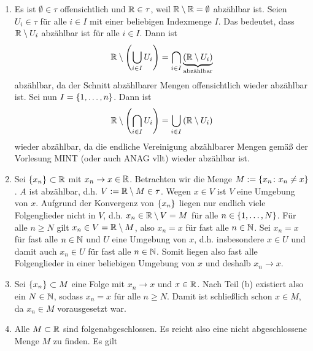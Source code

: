 \begin{exercisePage}
	\begin{enumerate}[leftmargin=\zulength, label=(zu \alph*)]
		\item Es ist $\emptyset \in \tau$ offensichtlich und $\mathbb{R} \in \tau$, weil $\mathbb{R} \setminus \mathbb{R} = \emptyset$ abzählbar ist. Seien $U_i \in \tau$ für alle $i \in I$ mit einer beliebigen Indexmenge $I$. Das bedeutet, dass $\mathbb{R} \setminus U_i$ abzählbar ist für alle $i \in I$. Dann ist
		\begin{equation*}
		\mathbb{R} \setminus \left( \bigcup_{i \in I} U_i \right) = \bigcap_{i \in I} \underbrace{\left( \mathbb{R} \setminus U_i \right)}_{\text{abzählbar}}
		\end{equation*}
		abzählbar, da der Schnitt abzählbarer Mengen offensichtlich wieder abzählbar ist. Sei nun $I = \left\{ 1,\dots,n \right\}$. Dann ist
		\begin{equation*}
		\mathbb{R} \setminus \left( \bigcap_{i \in I} U_i \right) = \bigcup_{i \in I} \left( \mathbb{R} \setminus U_i \right)
		\end{equation*}
		wieder abzählbar, da die endliche Vereinigung abzählbarer Mengen gemäß der Vorlesung MINT (oder auch ANAG vllt) wieder abzählbar ist.
		\item \begin{proof-equivalence}
			\hinrichtung Sei $\left\{ x_n \right\}_{} \subset \mathbb{R}$ mit $x_n \to x \in \mathbb{R}$. Betrachten wir die Menge $M \mathrel{:=} \left\{ x_n \colon x_n \neq x \right\}$. $A$ ist abzählbar, d.h. $V \mathrel{:=} \mathbb{R} \setminus M \in \tau$. Wegen $x \in V$ ist $V$ eine Umgebung von $x$. Aufgrund der Konvergenz von $\left\{ x_n \right\}_{}$ liegen nur endlich viele Folgenglieder nicht in $V$, d.h. $x_n \in \mathbb{R} \setminus V = M$ für alle $n \in \left\{ 1,\dots,N \right\}$. Für alle $n \ge N$ gilt $x_n \in V = \mathbb{R} \setminus M$, also $x_n = x$ für fast alle $n \in \mathbb{N}$.
			\rueckrichtung Sei $x_n = x$ für fast alle $n \in \mathbb{N}$ und $U$ eine Umgebung von $x$, d.h. insbesondere $x \in U$ und damit auch $x_n \in U$ für fast alle $n \in \mathbb{N}$. Somit liegen also fast alle Folgenglieder in einer beliebigen Umgebung von $x$ und deshalb $x_n \to x$.
		\end{proof-equivalence}
		\item Sei $\left\{ x_n \right\}_{} \subset M$ eine Folge mit $x_n \to x$ und $x \in \mathbb{R}$. Nach Teil (b) existiert also ein $N \in \mathbb{N}$, sodass $x_n = x$ für alle $n \ge N$. Damit ist schließlich schon $x \in M$, da $x_n \in M$ vorausgesetzt war. 
		\item Alle $M \subset \mathbb{R}$ sind folgenabgeschlossen. Es reicht also eine nicht abgeschlossene Menge $M$ zu finden. Es gilt
		\begin{equation*}

\end{equation*}
\end{enumerate}
\end{exercisePage}

